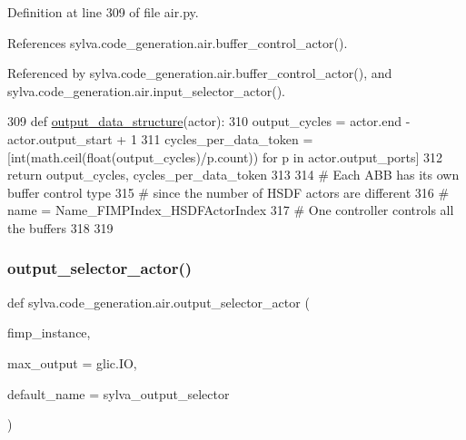 Definition at line 309 of file air.\+py.



References sylva.\+code\+\_\+generation.\+air.\+buffer\+\_\+control\+\_\+actor().



Referenced by sylva.\+code\+\_\+generation.\+air.\+buffer\+\_\+control\+\_\+actor(), and sylva.\+code\+\_\+generation.\+air.\+input\+\_\+selector\+\_\+actor().


\begin{DoxyCode}
309 \textcolor{keyword}{def }\hyperlink{namespacesylva_1_1code__generation_1_1air_a83186b3b999778cee36ac81d42b2cd44}{output\_data\_structure}(actor):
310     output\_cycles = actor.end - actor.output\_start + 1
311     cycles\_per\_data\_token = [int(math.ceil(float(output\_cycles)/p.count)) \textcolor{keywordflow}{for} p \textcolor{keywordflow}{in} actor.output\_ports]
312     \textcolor{keywordflow}{return} output\_cycles, cycles\_per\_data\_token
313 
314 \textcolor{comment}{# Each ABB has its own buffer control type}
315 \textcolor{comment}{# since the number of HSDF actors are different}
316 \textcolor{comment}{# name = Name\_FIMPIndex\_HSDFActorIndex}
317 \textcolor{comment}{# One controller controls all the buffers}
318 
319 
\end{DoxyCode}
\mbox{\label{namespacesylva_1_1code__generation_1_1air_a3e01248fb07a8e940919fe35ddcd684e}} 
\subsubsection{\texorpdfstring{output\+\_\+selector\+\_\+actor()}{output\_selector\_actor()}}
{\footnotesize\ttfamily def sylva.\+code\+\_\+generation.\+air.\+output\+\_\+selector\+\_\+actor (\begin{DoxyParamCaption}\item[{}]{fimp\+\_\+instance,  }\item[{}]{max\+\_\+output = {\ttfamily glic.IO},  }\item[{}]{default\+\_\+name = {\ttfamily \textquotesingle{}sylva\+\_\+output\+\_\+selector\textquotesingle{}} }\end{DoxyParamCaption})}



